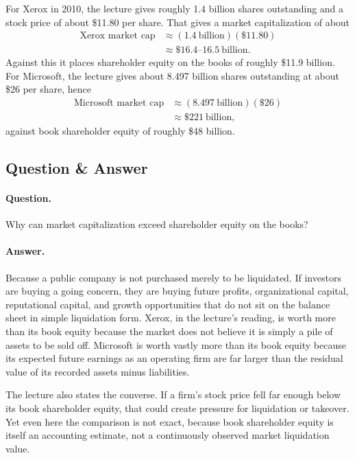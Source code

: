 For Xerox in 2010, the lecture gives roughly 1.4 billion shares outstanding and a stock price of about \$11.80 per share. That gives a market capitalization of about
\begin{align}
\text{Xerox market cap}
&\approx (1.4\ \text{billion})(\$11.80) \\
&\approx \$16.4\text{--}16.5\ \text{billion}.
\end{align}
Against this it places shareholder equity on the books of roughly \$11.9 billion. For Microsoft, the lecture gives about 8.497 billion shares outstanding at about \$26 per share, hence
\begin{align}
\text{Microsoft market cap}
&\approx (8.497\ \text{billion})(\$26)\\
&\approx \$221\ \text{billion},
\end{align}
against book shareholder equity of roughly \$48 billion.

\subsection{Question \& Answer}

\paragraph{Question.} Why can market capitalization exceed shareholder equity on the books?

\paragraph{Answer.} Because a public company is not purchased merely to be liquidated. If investors are buying a going concern, they are buying future profits, organizational capital, reputational capital, and growth opportunities that do not sit on the balance sheet in simple liquidation form. Xerox, in the lecture's reading, is worth more than its book equity because the market does not believe it is simply a pile of assets to be sold off. Microsoft is worth vastly more than its book equity because its expected future earnings as an operating firm are far larger than the residual value of its recorded assets minus liabilities.

The lecture also states the converse. If a firm's stock price fell far enough below its book shareholder equity, that could create pressure for liquidation or takeover. Yet even here the comparison is not exact, because book shareholder equity is itself an accounting estimate, not a continuously observed market liquidation value.

